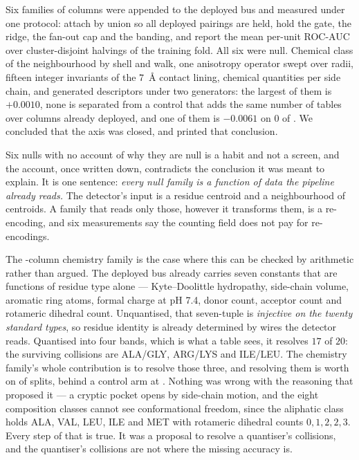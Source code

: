 \documentclass[11pt]{article}
\begin{document}
Six families of columns were appended to the deployed bus and measured under one
protocol: attach by union so all \CompTablesFull{} deployed pairings are held,
hold the gate, the ridge, the fan-out cap and the banding, and report the mean
per-unit ROC-AUC over \LadderSplits{} cluster-disjoint halvings of the training
fold. All six were null. Chemical class of the neighbourhood by shell and walk,
one anisotropy operator swept over radii, fifteen integer invariants of the
\(7\)~\AA{} contact lining, \FamChemCols{} chemical quantities per side chain,
and \GenTotal{} generated descriptors under two generators: the largest of them
is \(+0.0010\), none is separated from a control that adds the same number of
tables over columns already deployed, and one of them is
\(-0.0061\) on \(0\) of \LadderSplits{}. We concluded that the axis was closed,
and printed that conclusion.

Six nulls with no account of why they are null is a habit and not a screen, and
the account, once written down, contradicts the conclusion it was meant to
explain. It is one sentence: \emph{every null family is a function of data the
pipeline already reads.} The detector's input is a residue centroid and a
neighbourhood of centroids. A family that reads only those, however it
transforms them, is a re-encoding, and six measurements say the counting field
does not pay for re-encodings.

The \FamChemCols{}-column chemistry family is the case where this can be checked
by arithmetic rather than argued. The deployed bus already carries seven
constants that are functions of residue type alone --- Kyte--Doolittle
hydropathy, side-chain volume, aromatic ring atoms, formal charge at pH 7.4,
donor count, acceptor count and rotameric dihedral count. Unquantised, that
seven-tuple is \emph{injective on the twenty standard types}, so residue
identity is already determined by wires the detector reads. Quantised into four
bands, which is what a table sees, it resolves \(17\) of \(20\): the surviving
collisions are ALA/GLY, ARG/LYS and ILE/LEU. The chemistry family's whole
contribution is to resolve those three, and resolving them is worth
\FamChem{} on \FamChemSplits{} of \FamChemOf{} splits, behind a control arm at
\FamChemControl{}. Nothing was wrong with the reasoning that proposed it --- a
cryptic pocket opens by side-chain motion, and the eight composition classes
cannot see conformational freedom, since the aliphatic class holds ALA, VAL,
LEU, ILE and MET with rotameric dihedral counts \(0,1,2,2,3\). Every step of
that is true. It was a proposal to resolve a quantiser's collisions, and the
quantiser's collisions are not where the missing accuracy is.
\end{document}
